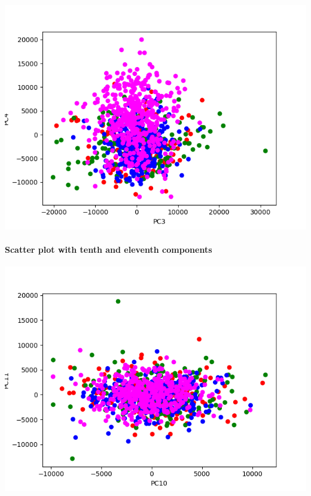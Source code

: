 \documentclass{report}
\begin{document}
  \includegraphics{img_04}

  \paragraph{Scatter plot with tenth and eleventh components}

  \includegraphics{img_05}
\end{document}
